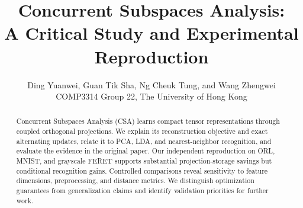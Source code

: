 \documentclass{article}
\title{Concurrent Subspaces Analysis:\\
A Critical Study and Experimental Reproduction}
\author{Ding Yuanwei, Guan Tik Sha, Ng Cheuk Tung, and Wang Zhengwei\\
COMP3314 Group 22, The University of Hong Kong}
\begin{document}
\maketitle
\begin{abstract}
Concurrent Subspaces Analysis (CSA) learns compact tensor representations through
coupled orthogonal projections. We explain its reconstruction objective and exact
alternating updates, relate it to PCA, LDA, and nearest-neighbor recognition, and
evaluate the evidence in the original paper. Our independent reproduction on
ORL, MNIST, and grayscale FERET supports substantial projection-storage savings
but conditional recognition gains. Controlled comparisons reveal sensitivity to
feature dimensions, preprocessing, and distance metrics. We distinguish
optimization guarantees from generalization claims and identify validation
priorities for further work.
\end{abstract}




\clearpage

\label{end:main}

\clearpage


\clearpage
\appendix

\end{document}
